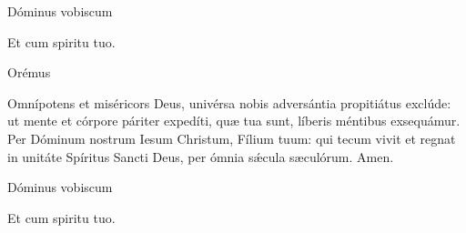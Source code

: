 

\rubric{\Vbar} Dóminus vobiscum

\rubric{\Rbar} Et cum spiritu tuo.

Orémus

Omnípotens et miséricors Deus, univérsa nobis adversántia propitiátus exclúde: ut mente et córpore páriter expedíti, quæ tua sunt, líberis méntibus exsequámur. Per Dóminum nostrum Iesum Christum, Fílium tuum: qui tecum vivit et regnat in unitáte Spíritus Sancti Deus, per ómnia sǽcula sæculórum.\rubric{\Rbar} Amen.

\rubric{\Vbar} Dóminus vobiscum

\rubric{\Rbar} Et cum spiritu tuo.
